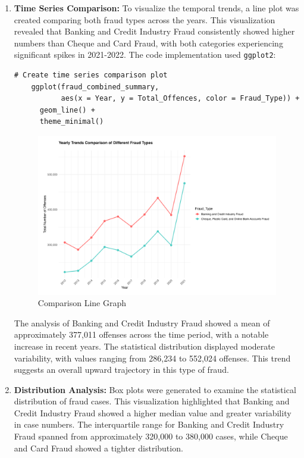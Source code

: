 \documentclass{article}
\begin{document}
\begin{enumerate}
    \item \textbf{Time Series Comparison:} To visualize the temporal trends, a line plot was created comparing both fraud types across the years. This visualization revealed that Banking and Credit Industry Fraud consistently showed higher numbers than Cheque and Card Fraud, with both categories experiencing significant spikes in 2021-2022. The code implementation used \texttt{ggplot2}:
    
    \begin{lstlisting}[style=RStyle, caption={Time Series Comparison Plot}]
    # Create time series comparison plot
    ggplot(fraud_combined_summary,
           aes(x = Year, y = Total_Offences, color = Fraud_Type)) +
      geom_line() +
      theme_minimal()
    \end{lstlisting}
    
    \begin{figure}[H]
        \centering
        \includegraphics[width=0.7\linewidth]{Images/Plot1.png}
        \caption{Comparison Line Graph}
        \label{fig:comparison_line}
    \end{figure}
    
    The analysis of Banking and Credit Industry Fraud showed a mean of approximately 377,011 offenses across the time period, with a notable increase in recent years. The statistical distribution displayed moderate variability, with values ranging from 286,234 to 552,024 offenses. This trend suggests an overall upward trajectory in this type of fraud.
    
    \item \textbf{Distribution Analysis:} Box plots were generated to examine the statistical distribution of fraud cases. This visualization highlighted that Banking and Credit Industry Fraud showed a higher median value and greater variability in case numbers. The interquartile range for Banking and Credit Industry Fraud spanned from approximately 320,000 to 380,000 cases, while Cheque and Card Fraud showed a tighter distribution.
    

\end{enumerate}
\end{document}
